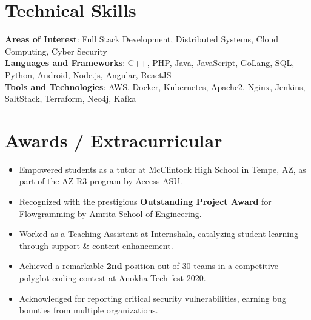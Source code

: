 \documentclass[letterpaper,11pt]{article}
\newcommand{\resumeItem}[1]{
  \item\small{
    {#1 \vspace{-2pt}}
  }
}
\newcommand{\resumeItemListStart}{\begin{itemize}}
\newcommand{\resumeItemListEnd}{\end{itemize}\vspace{-5pt}}
\begin{document}
\section{Technical Skills}
 \begin{itemize}[leftmargin=0.15in, label={}]
    \small{\item{
    \textbf{Areas of Interest}{: Full Stack Development, Distributed Systems, Cloud Computing, Cyber Security} \\
     \textbf{Languages and Frameworks}{: C++, PHP, Java, JavaScript, GoLang, SQL, Python, Android, Node.js, Angular, ReactJS} \\
     \textbf{Tools and Technologies}{: AWS, Docker, Kubernetes, Apache2, Nginx, Jenkins, SaltStack, Terraform, Neo4j, Kafka} \\
    }}
 \end{itemize}
 \vspace{-10pt}


\section{Awards / Extracurricular}
            \resumeItemListStart
                        	\resumeItem{Empowered students as a tutor at McClintock High School in Tempe, AZ, as part of the AZ-R3 program by Access ASU.}\vspace{-5pt}
            	\resumeItem{Recognized with the prestigious \textbf{Outstanding Project Award} for Flowgramming by Amrita School of Engineering.}\vspace{-5pt}
            	\resumeItem{Worked as a Teaching Assistant at Internshala, catalyzing student learning through support \& content enhancement.}
\vspace{-5pt}            	            
                \resumeItem{Achieved a remarkable \textbf{2nd} position out of 30 teams in a competitive polyglot coding contest at Anokha Tech-fest 2020.}\vspace{-5pt}
                \resumeItem{Acknowledged for reporting critical security vulnerabilities, earning bug bounties from multiple organizations.}\vspace{-5pt}
            \resumeItemListEnd
\end{document}
